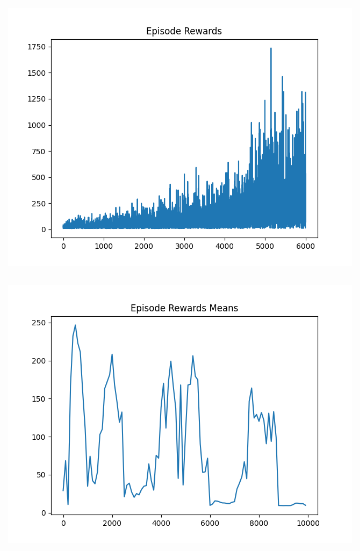 \begin{figure}[H]
    \centering
    \begin{subfigure}{.47\linewidth}
        \centering
        \includegraphics[width=\textwidth]{pole/2024-06-14_18-50-42_dqn_cartpole_episode_rewards.png}
    \end{subfigure}
    \begin{subfigure}{.47\linewidth}
        \centering
        \includegraphics[width=\textwidth]{pole/2024-06-13_18-42-33_dqn_cartpole_episode_rewards_means.png}
    \end{subfigure}
    \begin{subfigure}{.47\linewidth}
        \centering

\end{subfigure}
\end{figure}
